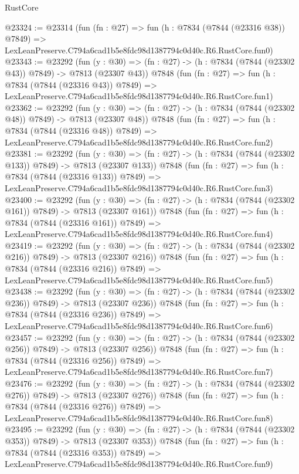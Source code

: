 \begin{lexlean}{RustCore}
\begin{coremodule}
@23324 := @23314
    (fun (fn : @27) =>
    fun (h : @7834 (@7844 (@23316 @38)) @7849) =>
    LexLeanPreserve.C794a6cad1b5e8fdc98d1387794c0d40c.R6.RustCore.fun0)
@23343 := @23292
    (fun (y : @30) => (fn : @27) -> (h : @7834 (@7844 (@23302 @43)) @7849) -> @7813 (@23307 @43))
    @7848
    (fun (fn : @27) =>
    fun (h : @7834 (@7844 (@23316 @43)) @7849) =>
    LexLeanPreserve.C794a6cad1b5e8fdc98d1387794c0d40c.R6.RustCore.fun1)
@23362 := @23292
    (fun (y : @30) => (fn : @27) -> (h : @7834 (@7844 (@23302 @48)) @7849) -> @7813 (@23307 @48))
    @7848
    (fun (fn : @27) =>
    fun (h : @7834 (@7844 (@23316 @48)) @7849) =>
    LexLeanPreserve.C794a6cad1b5e8fdc98d1387794c0d40c.R6.RustCore.fun2)
@23381 := @23292
    (fun (y : @30) => (fn : @27) -> (h : @7834 (@7844 (@23302 @133)) @7849) -> @7813 (@23307 @133))
    @7848
    (fun (fn : @27) =>
    fun (h : @7834 (@7844 (@23316 @133)) @7849) =>
    LexLeanPreserve.C794a6cad1b5e8fdc98d1387794c0d40c.R6.RustCore.fun3)
@23400 := @23292
    (fun (y : @30) => (fn : @27) -> (h : @7834 (@7844 (@23302 @161)) @7849) -> @7813 (@23307 @161))
    @7848
    (fun (fn : @27) =>
    fun (h : @7834 (@7844 (@23316 @161)) @7849) =>
    LexLeanPreserve.C794a6cad1b5e8fdc98d1387794c0d40c.R6.RustCore.fun4)
@23419 := @23292
    (fun (y : @30) => (fn : @27) -> (h : @7834 (@7844 (@23302 @216)) @7849) -> @7813 (@23307 @216))
    @7848
    (fun (fn : @27) =>
    fun (h : @7834 (@7844 (@23316 @216)) @7849) =>
    LexLeanPreserve.C794a6cad1b5e8fdc98d1387794c0d40c.R6.RustCore.fun5)
@23438 := @23292
    (fun (y : @30) => (fn : @27) -> (h : @7834 (@7844 (@23302 @236)) @7849) -> @7813 (@23307 @236))
    @7848
    (fun (fn : @27) =>
    fun (h : @7834 (@7844 (@23316 @236)) @7849) =>
    LexLeanPreserve.C794a6cad1b5e8fdc98d1387794c0d40c.R6.RustCore.fun6)
@23457 := @23292
    (fun (y : @30) => (fn : @27) -> (h : @7834 (@7844 (@23302 @256)) @7849) -> @7813 (@23307 @256))
    @7848
    (fun (fn : @27) =>
    fun (h : @7834 (@7844 (@23316 @256)) @7849) =>
    LexLeanPreserve.C794a6cad1b5e8fdc98d1387794c0d40c.R6.RustCore.fun7)
@23476 := @23292
    (fun (y : @30) => (fn : @27) -> (h : @7834 (@7844 (@23302 @276)) @7849) -> @7813 (@23307 @276))
    @7848
    (fun (fn : @27) =>
    fun (h : @7834 (@7844 (@23316 @276)) @7849) =>
    LexLeanPreserve.C794a6cad1b5e8fdc98d1387794c0d40c.R6.RustCore.fun8)
@23495 := @23292
    (fun (y : @30) => (fn : @27) -> (h : @7834 (@7844 (@23302 @353)) @7849) -> @7813 (@23307 @353))
    @7848
    (fun (fn : @27) =>
    fun (h : @7834 (@7844 (@23316 @353)) @7849) =>
    LexLeanPreserve.C794a6cad1b5e8fdc98d1387794c0d40c.R6.RustCore.fun9)

\end{coremodule}
\end{lexlean}
